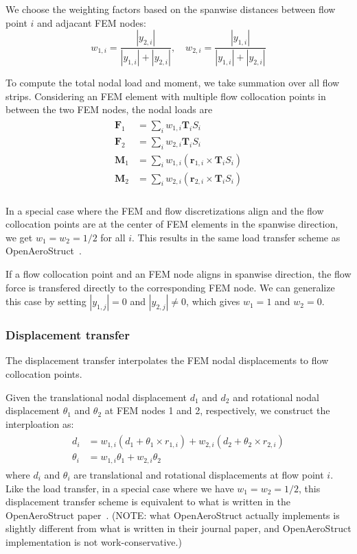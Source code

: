 \documentclass[10pt]{article}
\newcommand{\mb}[1]{\boldsymbol{\mathbf{#1}}} %
\begin{document}
We choose the weighting factors based on the spanwise distances between flow point $i$ and adjacant FEM nodes:
\begin{equation}
	w_{1,i} = \frac{|y_{2, i}|}{|y_{1, i}| + |y_{2, i}|}, \quad w_{2,i} = \frac{|y_{1, i}|}{|y_{1, i}| + |y_{2, i}|}
\end{equation}

To compute the total nodal load and moment, we take summation over all flow strips.
Considering an FEM element with multiple flow collocation points in between the two FEM nodes, the nodal loads are
\begin{align}
\begin{aligned}
	\mb{F}_1 &= \sum_i w_{1,i} \mb{T}_i S_i \\
	\mb{F}_2 &= \sum_i w_{2,i} \mb{T}_i S_i \\
	\mb{M}_1 &= \sum_i w_{1,i} \left( \mb{r}_{1, i} \times \mb{T}_i S_i \right) \\
	\mb{M}_2 &= \sum_i w_{2,i} \left( \mb{r}_{2, i} \times \mb{T}_i S_i \right)  \\
\end{aligned}
\end{align}

In a special case where the FEM and flow discretizations align and the flow collocation points are at the center of FEM elements in the spanwise direction, we get $w_1=w_2 = 1/2$ for all $i$.
This results in the same load transfer scheme as OpenAeroStruct~\cite{Jasa2018a}.

If a flow collocation point and an FEM node aligns in spanwise direction, the flow force is transfered directly to the corresponding FEM node.
We can generalize this case by setting $|y_{1, j}| = 0$ and $|y_{2, j}| \neq 0$, which gives $w_1 = 1$ and $w_2 = 0$.

\subsubsection{Displacement transfer}
The displacement transfer interpolates the FEM nodal displacements to flow collocation points.

Given the translational nodal displacement $d_1$ and $d_2$ and rotational nodal displacement $\theta_1$ and $\theta_2$ at FEM nodes 1 and 2, respectively, we construct the interploation as:
\begin{align}
\begin{aligned}
	d_i      &= w_{1,i} \left( d_1 + \theta_1 \times r_{1, i} \right) + w_{2,i} \left( d_2 + \theta_2 \times r_{2, i} \right)  \\
	\theta_i &= w_{1,i} \theta_1 + w_{2,i} \theta_2
\end{aligned}	
\end{align}
where $d_i$ and $\theta_i$ are translational and rotational displacements at flow point $i$.
Like the load transfer, in a special case where we have $w_1=w_2 = 1/2$, this displacement transfer scheme is equivalent to what is written in the OpenAeroStruct paper~\citep{Jasa2018a}.
(NOTE: what OpenAeroStruct actually implements is slightly different from what is written in their journal paper, and OpenAeroStruct implementation is not work-conservative.)
\end{document}

